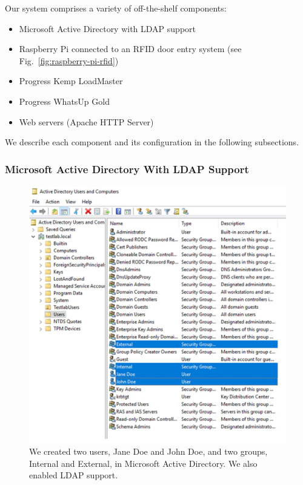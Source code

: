 Our system comprises a variety of off-the-shelf components:

\begin{itemize}
\item Microsoft Active Directory with LDAP support
\item Raspberry Pi connected to an RFID door entry system (see
  Fig.~\ref{fig:raspberry-pi-rfid})
\item Progress Kemp LoadMaster~\cite{progress-kemp-loadmaster-xx}
\item Progress WhatsUp Gold~\cite{progress-kemp-whatsup-gold-xx}
\item Web servers (Apache HTTP Server)
\end{itemize}

We describe each component and its configuration in the following
subsections.

\subsubsection{Microsoft Active Directory With LDAP Support}

\begin{figure}
  \centerline{\includegraphics[width=\columnwidth]{img/active-directory}}
  \caption{We created two users, Jane Doe and John Doe, and two
    groups, Internal and External, in Microsoft Active Directory.  We
    also enabled LDAP support.}\label{fig:active-directory}
\end{figure}

